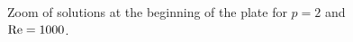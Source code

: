 \begin{figure}[!h]
\caption{Zoom of solutions at the beginning of the plate for $p=2$ and $\Reyn = 1000$.}
\end{figure}

